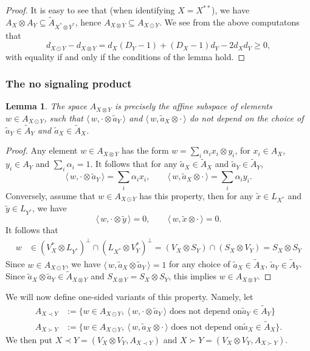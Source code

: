 \documentclass[12pt]{article}
\newtheorem{lemma}{Lemma}
\theoremstyle{definition}
\theoremstyle{remark}
\def\<{\langle\,}
\def\>{\,\rangle}
\begin{document}
\begin{proof} It is easy to see that (when identifying $X=X^{**}$), we have $A_X\otimes
A_Y\subseteq \tilde A_{X^*\otimes  Y^*}$, hence $A_{X\otimes Y}\subseteq A_{X\odot Y}$. We see from the above computatons that
\[
d_{X\odot Y}-d_{X\otimes Y}=d_X(D_Y-1)+(D_X-1)d_Y-2d_Xd_Y\ge 0,
\]
with equality if and only if the conditions of the lemma hold.

\end{proof}


\subsubsection{The no signaling product} 

\begin{lemma}\label{lemma:otimes_odot}
The space $A_{X\otimes Y}$ is precisely the affine subspace of elements $w\in A_{X\odot Y}$,
such that $\<w,\cdot \otimes \tilde a_Y\>$ and $\<w,\tilde a_X\otimes \cdot\>$ do not
depend on the choice of $\tilde a_Y\in \tilde A_Y$ and $\tilde a_X\in \tilde A_X$.
\end{lemma}

\begin{proof} Any element $w\in A_{X\otimes Y}$ has the form $w=\sum_i\alpha_i x_i\otimes
y_i$, for $x_i\in A_X$, $y_i\in A_Y$ and $\sum_i\alpha_i=1$. It follows that for any
$\tilde a_X\in \tilde A_X$ and $\tilde a_Y\in \tilde A_Y$,
\[
\<w,\cdot\otimes \tilde a_Y\>=\sum_i\alpha_ix_i,\qquad \<w,\tilde a_X\otimes
\cdot\>=\sum_i\alpha_iy_i.
\]
Conversely, assume that $w\in A_{X\odot Y}$ has this property, then for any $\tilde x\in
L_{X^*}$ and
$\tilde y\in L_{Y^*}$, we have
\[
\<w,\cdot\otimes \tilde y\>=0,\qquad \<w,\tilde x\otimes \cdot\>=0.
\]
It follows that
\begin{align*}
w&\in (V_X^*\otimes L_{Y^*})^\perp\cap (L_{X^*}\otimes V_Y^*)^\perp=
(V_X\otimes S_Y)\cap (S_X\otimes V_Y)=S_X\otimes S_Y
\end{align*}
Since $w\in A_{X\odot Y}$, we have $\<w,\tilde a_X\otimes \tilde a_Y\>=1$ for any choice
of $\tilde a_X\in \tilde A_X$,  $\tilde a_Y\in \tilde A_Y$. Since $\tilde a_X\otimes
\tilde a_Y\in \tilde A_{X\otimes Y}$ and $S_{X\otimes Y}=S_X\otimes S_Y$, this implies
$w\in A_{X\otimes Y}$.

\end{proof}


We will now define one-sided variants of this property. Namely, let 
\begin{align*}
A_{X\prec Y}&:=\{w\in A_{X\odot Y},\ \<w,\cdot \otimes \tilde a_Y\>\text{ does not depend on
} \tilde a_Y\in \tilde A_Y\}\\
A_{X\succ Y}&:=\{w\in A_{X\odot Y},\ \<w,\tilde a_X \otimes \cdot\>\text{ does not depend on
} \tilde a_X\in \tilde A_X\}.
\end{align*}
We then put $X\prec Y=(V_X\otimes V_Y, A_{X\prec Y})$ and $X\succ Y=(V_X\otimes V_Y,
A_{X\succ Y})$.
\end{document}
